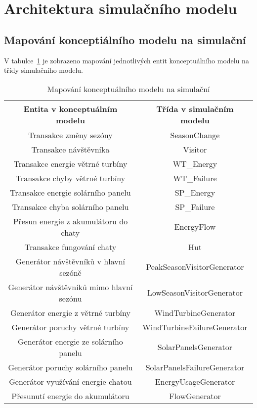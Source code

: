 \section{Architektura simulačního modelu}\label{chap:mapping}

\subsection{Mapování konceptiálního modelu na simulační}

V tabulce~\ref{tab:map_con_sim} je zobrazeno mapování jednotlivých entit konceptuálního modelu na třídy simulačního modelu.

\begin{center}
    \begin{table}[!h]
        \centering
        \begin{tabular}{|c|c|}
            \hline
            Entita v konceptuálním modelu & Třída v simulačním modelu \\
            \hline
            \hline
            Transakce změny sezóny & SeasonChange \\
            \hline
            Transakce návštěvníka & Visitor \\
            \hline
            Transakce energie větrné turbíny & WT\_Energy \\
            \hline
            Transakce chyby větrné turbíny & WT\_Failure \\
            \hline
            Transakce energie solárního panelu & SP\_Energy \\
            \hline
            Transakce chyba solárního panelu & SP\_Failure \\
            \hline
            Přesun energie z akumulátoru do chaty & EnergyFlow \\
            \hline
            Transakce fungování chaty & Hut \\
            \hline
            Generátor návštěvníků v hlavní sezóně & PeakSeasonVisitorGenerator \\
            \hline
            Generátor návštěvníků mimo hlavní sezónu & LowSeasonVisitorGenerator \\
            \hline
            Generátor energie z větrné turbíny & WindTurbineGenerator \\
            \hline
            Generátor poruchy větrné turbíny & WindTurbineFailureGenerator \\
            \hline
            Generátor energie ze solárního panelu & SolarPanelsGenerator \\
            \hline
            Generátor poruchy solárního panelu & SolarPanelsFailureGenerator \\
            \hline
            Generátor využívání energie chatou & EnergyUsageGenerator \\
            \hline
            Přesunutí energie do akumulátoru & FlowGenerator \\
            \hline
            \hline
        \end{tabular}
        \caption{Mapování konceptuálního modelu na simulační}
        \label{tab:map_con_sim}
    \end{table}
\end{center}


